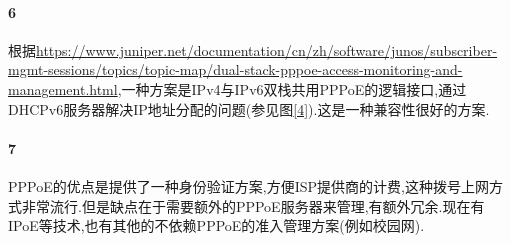 \documentclass[a4paper]{article}
\begin{document}
\paragraph{6}
根据\url{https://www.juniper.net/documentation/cn/zh/software/junos/subscriber-mgmt-sessions/topics/topic-map/dual-stack-pppoe-access-monitoring-and-management.html},一种方案是IPv4与IPv6双栈共用PPPoE的逻辑接口,通过DHCPv6服务器解决IP地址分配的问题(参见图\ref{4}).这是一种兼容性很好的方案.
\paragraph{7}
PPPoE的优点是提供了一种身份验证方案,方便ISP提供商的计费,这种拨号上网方式非常流行.但是缺点在于需要额外的PPPoE服务器来管理,有额外冗余.现在有IPoE等技术,也有其他的不依赖PPPoE的准入管理方案(例如校园网).
\end{document}
